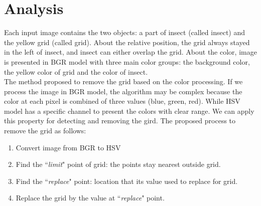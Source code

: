 \section{Analysis}
Each input image contains the two objects: a part of insect (called insect) and the yellow grid (called grid). About the relative position, the grid always stayed in the left of insect, and insect can either overlap the grid. About the color, image is presented in BGR model with three main color groups: the background color, the yellow color of grid and the color of insect.\\[0.2cm]
The method proposed to remove the grid based on the color processing. If we process the image in BGR model, the algorithm may be complex because the color at each pixel is combined of three values (blue, green, red). While HSV model has a specific channel to present the colors with clear range. We can apply this property for detecting and removing the gird. The proposed process to remove  the grid as follows:
\begin{enumerate}
\item Convert image from BGR to HSV
\item Find the ``\textit{limit}" point of grid: the points stay nearest outside grid.
\item Find the ``\textit{replace}" point: location that its value used to replace for grid.
\item Replace the grid by the value at ``\textit{replace}" point.
\end{enumerate}
